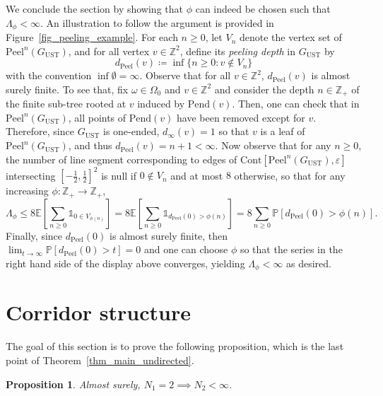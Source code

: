 \documentclass[a4paper, 11pt]{article} %
\theoremstyle{plain}
\newtheorem{proposition}[theorem]{Proposition}
\newcommand{\backward}{\mathrm{Pend}}
\newcommand{\E}{\mathbb{E}}
\newcommand{\Z}{\mathbb{Z}}
\newcommand{\1}{\mathds 1}
\renewcommand{\P}{\mathbb{P}}
\numberwithin{equation}{section}
\begin{document}
We conclude the section by showing that $\phi$ can indeed be chosen such that $\Lambda_\phi<\infty$. An illustration to follow the argument is provided in Figure~\ref{fig_peeling_example}. For each $n\geq0$, let $V_n$ denote the vertex set of $\mathrm{Peel}^n(G_\mathrm{UST})$, and for all vertex $v\in\Z^2$, define its \emph{peeling depth} in $G_\mathrm{UST}$ by
    \[d_\mathrm{Peel}(v)\coloneqq\inf\{n\geq0:v\notin V_n\}\]
with the convention $\inf\emptyset=\infty$. Observe that for all $v\in\Z^2$, $d_\mathrm{Peel}(v)$ is almost surely finite. To see that, fix $\omega\in\Omega_0$ and $v\in\Z^2$ and consider the depth $n\in\Z_+$ of the finite sub-tree rooted at $v$ induced by $\backward(v)$. Then, one can check that in $\mathrm{Peel}^n(G_\mathrm{UST})$, all points of $\backward(v)$ have been removed except for $v$. Therefore, since $G_\mathrm{UST}$ is one-ended, $d_\infty(v)=1$ so that $v$ is a leaf of $\mathrm{Peel}^n(G_\mathrm{UST})$, and thus $d_\mathrm{Peel}(v)=n+1<\infty$. Now observe that for any $n\geq0$, the number of line segment corresponding to edges of $\mathrm{Cont}[\mathrm{Peel}^n(G_\mathrm{UST}), \varepsilon]$ intersecting $[-\frac12,\frac12]^2$ is null if $0\notin V_n$ and at most $8$ otherwise, so that for any increasing $\phi:\Z_+\to\Z_+$,
    \[\Lambda_\phi\leq8\E\left[\sum_{n\geq0}\1_{0\in V_{\phi(n)}}\right]=8\E\left[\sum_{n\geq0}\1_{d_\mathrm{Peel}(0)>\phi(n)}\right]=8\sum_{n\geq0}\P[d_\mathrm{Peel}(0)>\phi(n)].\]
Finally, since $d_\mathrm{Peel}(0)$ is almost surely finite, then $\lim_{t\to\infty}\P[d_\mathrm{Peel}(0)>t]=0$ and one can choose $\phi$ so that the series in the right hand side of the display above converges, yielding $\Lambda_\phi<\infty$ as desired.


\section{Corridor structure}

\label{section_doors}


The goal of this section is to prove the following proposition, which is the last point of Theorem~\ref{thm_main_undirected}.


\begin{proposition}
    \label{prop_N1_is_2_implies_N2_finite}
    Almost surely, $N_1=2\implies N_2<\infty$.
\end{proposition}
\end{document}
